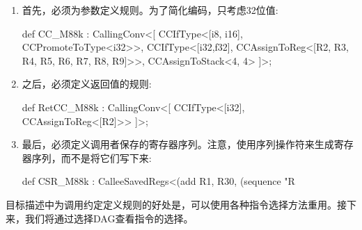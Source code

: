 \begin{enumerate}
\item
首先，必须为参数定义规则。为了简化编码，只考虑32位值:

\begin{cpp}
def CC_M88k : CallingConv<[
    CCIfType<[i8, i16], CCPromoteToType<i32>>,
    CCIfType<[i32,f32],
        CCAssignToReg<[R2, R3, R4, R5, R6, R7, R8, R9]>>,
    CCAssignToStack<4, 4>
]>;
\end{cpp}

\item
之后，必须定义返回值的规则:

\begin{cpp}
def RetCC_M88k : CallingConv<[
    CCIfType<[i32], CCAssignToReg<[R2]>>
]>;
\end{cpp}

\item
最后，必须定义调用者保存的寄存器序列。注意，使用序列操作符来生成寄存器序列，而不是将它们写下来:

\begin{cpp}
def CSR_M88k :
    CalleeSavedRegs<(add R1, R30,
        (sequence "R%
\end{cpp}
\end{enumerate}

目标描述中为调用约定定义规则的好处是，可以使用各种指令选择方法重用。接下来，我们将通过选择DAG查看指令的选择。




